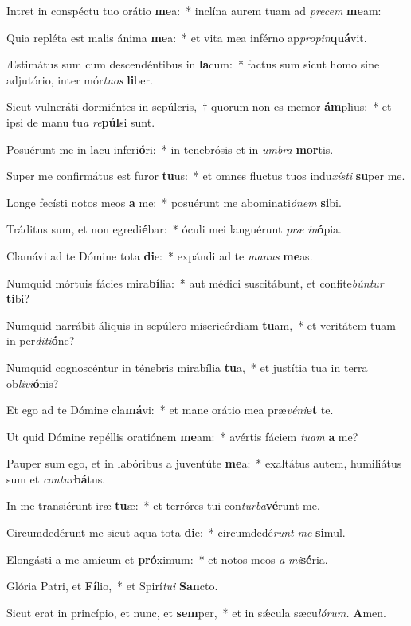 \item Intret in conspéctu tuo orátio \textbf{me}a:~* inclína aurem tuam ad \textit{precem} \textbf{me}am:
\item Quia repléta est malis ánima \textbf{me}a:~* et vita mea inférno ap\textit{propin}\textbf{quá}vit.
\item Æstimátus sum cum descendéntibus in \textbf{la}cum:~* factus sum sicut homo sine adjutório, inter mór\textit{tuos} \textbf{li}ber.
\item Sicut vulneráti dormiéntes in sepúlcris,~† quorum non es memor \textbf{ám}plius:~* et ipsi de manu tu\tinyhspace\textit{a} \textit{re}\textbf{púl}si sunt.
\item Posuérunt me in lacu inferi\textbf{ó}ri:~* in tenebrósis et in \textit{umbra} \textbf{mor}tis.
\item Super me confirmátus est furor \textbf{tu}us:~* et omnes fluctus tuos indu\tinyhspace\textit{xísti} \textbf{su}per me.
\item Longe fecísti notos meos \textbf{a} me:~* posuérunt me abominati\tinyhspace\textit{ónem} \textbf{si}bi.
\item Tráditus sum, et non egredi\textbf{é}bar:~* óculi mei languérunt \textit{præ} \textit{in}\textbf{ó}pia.
\item Clamávi ad te Dómine tota \textbf{di}e:~* expándi ad te \textit{manus} \textbf{me}as.
\item Numquid mórtuis fácies mira\textbf{bí}lia:~* aut médici suscitábunt, et confite\tinyhspace\textit{búntur} \textbf{ti}bi?
\item Numquid narrábit áliquis in sepúlcro misericórdiam \textbf{tu}am,~* et veritátem tuam in per\textit{diti}\textbf{ó}ne?
\item Numquid cognoscéntur in ténebris mirabília \textbf{tu}a,~* et justítia tua in terra ob\tinyhspace\textit{livi}\textbf{ó}nis?
\item Et ego ad te Dómine cla\textbf{má}vi:~* et mane orátio mea præ\textit{véni}\textbf{et} te.
\item Ut quid Dómine repéllis oratiónem \textbf{me}am:~* avértis fáciem \textit{tuam} \textbf{a} me?
\item Pauper sum ego, et in labóribus a juventúte \textbf{me}a:~* exaltátus autem, humiliátus sum et \textit{contur}\textbf{bá}tus.
\item In me transiérunt iræ \textbf{tu}æ:~* et terróres tui con\tinyhspace\textit{turba}\textbf{vé}runt me.
\item Circumdedérunt me sicut aqua tota \textbf{di}e:~* circumdedé\tinyhspace\textit{runt} \textit{me} \textbf{si}mul.
\item Elongásti a me amícum et \textbf{pró}ximum:~* et notos meos \textit{a} \textit{mi}\textbf{sé}ria.
\item Glória Patri, et \textbf{Fí}lio,~* et Spirí\tinyhspace\textit{tui} \textbf{San}cto.
\item Sicut erat in princípio, et nunc, et \textbf{sem}per,~* et in sǽcula sæcu\tinyhspace\textit{lórum.} \textbf{A}men.
